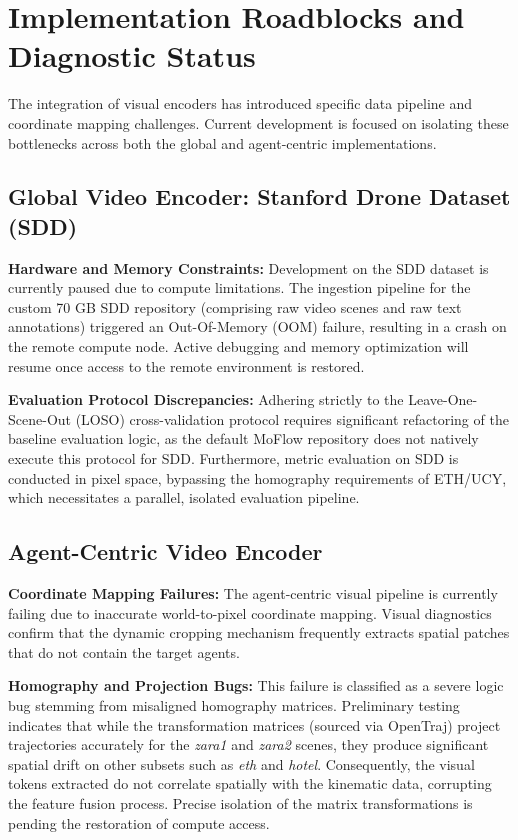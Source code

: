 \section{Implementation Roadblocks and Diagnostic Status}
The integration of visual encoders has introduced specific data pipeline and coordinate mapping challenges. Current development is focused on isolating these bottlenecks across both the global and agent-centric implementations.

\subsection{Global Video Encoder: Stanford Drone Dataset (SDD)}
\textbf{Hardware and Memory Constraints:} Development on the SDD dataset is currently paused due to compute limitations. The ingestion pipeline for the custom 70 GB SDD repository (comprising raw video scenes and raw text annotations) triggered an Out-Of-Memory (OOM) failure, resulting in a crash on the remote compute node. Active debugging and memory optimization will resume once access to the remote environment is restored.

\textbf{Evaluation Protocol Discrepancies:} Adhering strictly to the Leave-One-Scene-Out (LOSO) cross-validation protocol requires significant refactoring of the baseline evaluation logic, as the default MoFlow repository does not natively execute this protocol for SDD. Furthermore, metric evaluation on SDD is conducted in pixel space, bypassing the homography requirements of ETH/UCY, which necessitates a parallel, isolated evaluation pipeline.

\subsection{Agent-Centric Video Encoder}
\textbf{Coordinate Mapping Failures:} The agent-centric visual pipeline is currently failing due to inaccurate world-to-pixel coordinate mapping. Visual diagnostics confirm that the dynamic cropping mechanism frequently extracts spatial patches that do not contain the target agents.

\textbf{Homography and Projection Bugs:} This failure is classified as a severe logic bug stemming from misaligned homography matrices. Preliminary testing indicates that while the transformation matrices (sourced via OpenTraj) project trajectories accurately for the \textit{zara1} and \textit{zara2} scenes, they produce significant spatial drift on other subsets such as \textit{eth} and \textit{hotel}. Consequently, the visual tokens extracted do not correlate spatially with the kinematic data, corrupting the feature fusion process. Precise isolation of the matrix transformations is pending the restoration of compute access.

